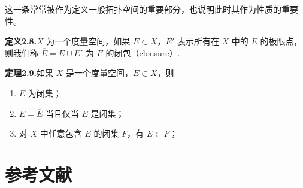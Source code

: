 \documentclass{article}
\begin{document}
这一条常常被作为定义一般拓扑空间的重要部分，也说明此时其作为性质的重要性。

\textbf{定义2.8.}$X$ 为一个度量空间，如果 $E\subset X$，$E'$ 表示所有在 $X$ 中的 $E$ 的极限点，
则我们称 $\overline{E} = E\cup E'$ 为 $E$ 的闭包（clousure）.

\textbf{定理2.9.}如果 $X$ 是一个度量空间，$E\subset X$，则
\begin{enumerate}[label={\textbullet}]
    \item $\overline{E}$ 为闭集；
    \item $E = \overline{E}$ 当且仅当 $E$ 是闭集；
    \item 对 $X$ 中任意包含 $E$ 的闭集 $F$，有 $\overline{E} \subset F$；
\end{enumerate}

\section*{参考文献} %
\end{document}

